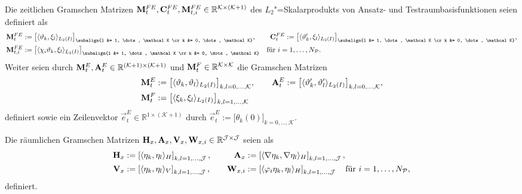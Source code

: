 \documentclass[../main.tex]{subfiles}
\begin{document}
\begin{Definition}
\label{definition:zeitliche_bausteine}
    Die zeitlichen Gramschen Matrizen $\mathbf{M}_{t}^{FE}, \mathbf{C}_{t}^{FE}, \mathbf{M}_{t,i}^{FE} \in \mathbb{R}^{\mathcal K \times (\mathcal K + 1)}$ des $L_{2}$"=Skalarprodukts von Ansatz- und Testraumbasisfunktionen seien definiert als
    \begin{align}
        \mat{M}_{t}^{FE} &:= \big[ \skp{\theta_{k}}{\xi_{l}}{L_{2}(I)} \big]_{\subalign{l &= 1, \dots, \mathcal K \cr k &= 0, \dots, \mathcal K}},
        \qquad
        \mat{C}_{t}^{FE} := \big[ \skp{\theta_{k}'}{\xi_{l}}{L_{2}(I)} \big]_{\subalign{l &= 1, \dots, \mathcal K \cr k &= 0, \dots, \mathcal K}},
        \\
        \mat{M}_{t,i}^{FE} &:= \big[ \skp{\chi_{i}\theta_{k}}{\xi_{l}}{L_{2}(I)} \big]_{\subalign{l &= 1, \dots, \mathcal K \cr k &= 0, \dots, \mathcal K}} \quad \text{für } i = 1, \dots, N_{\mathcal P}.
    \end{align}
    Weiter seien durch $\mathbf{M}_{t}^{E}, \mathbf{A}_{t}^{E} \in \mathbb{R}^{(\mathcal K + 1)\times (\mathcal K + 1)}$ und $\mathbf{M}_{t}^{F} \in \mathbb{R}^{\mathcal K \times \mathcal K}$ die Gramschen Matrizen
    \begin{align}
        \mathbf{M}_{t}^{E} &:= \big[ \langle\vartheta_{k},\vartheta_{l}\rangle_{L_{2}(I)}\big]_{k,l = 0, \dots, \mathcal K},
        \qquad
        \mathbf{A}_{t}^{E} := \big[ \langle\vartheta_{k}',\vartheta_{l}'\rangle_{L_{2}(I)}\big]_{k,l = 0, \dots, \mathcal K},
        \\
        \mathbf{M}_{t}^{F} &:= \big[ \langle\xi_{k},\xi_{l}\rangle_{L_{2}(I)}\big]_{k,l = 1, \dots, \mathcal K}
    \end{align}
    definiert sowie ein Zeilenvektor $\vec{e}^{E}_{t} \in \mathbb{R}^{1 \times (\mathcal K + 1)}$ durch
    $\vec{e}^{E}_{t} := \big[ \theta_{k}(0) \big]_{k = 0, \dots, \mathcal K}$.
\end{Definition}

\begin{Definition}
\label{definition:raeumliche_bausteine}
    Die räumlichen Gramschen Matrizen $\mathbf{H}_{x}, \mathbf{A}_{x}, \mathbf{V}_{x}, \mathbf{W}_{x,i} \in \mathbb{R}^{\mathcal J \times \mathcal J}$ seien als
    \begin{equation}
    \begin{aligned}
        \mathbf{H}_{x} &:= \left[ \langle\eta_{k},\eta_{l}\rangle_{H} \right]_{k,l=1, \dots, \mathcal J},&
        \quad
        \mathbf{A}_{x} &:= \left[ \langle\nabla \eta_{k},\nabla \eta_{l}\rangle_{H} \right]_{k,l=1, \dots, \mathcal J},
        \\
        \mathbf{V}_{x} &:= \left[ \langle\eta_{k},\eta_{l}\rangle_{V} \right]_{k,l = 1, \dots, \mathcal J},&
        \quad
        \mathbf{W}_{x,i} &:= \left[ \langle\varphi_{i} \eta_{k},\eta_{l}\rangle_{H} \right]_{k, l = 1, \dots, \mathcal J} \quad \text{für } i = 1, \dots, N_{\mathcal P},
    \end{aligned}
    \end{equation}
    definiert.
\end{Definition}
\end{document}
